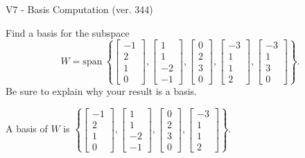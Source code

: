 \begin{exercise}
  \begin{exerciseTitle}V7 - Basis Computation (ver. 344)\end{exerciseTitle}
  \begin{exerciseStatement}
    Find a basis for the subspace 
\[W=\mathrm{span}\ \left\{\left[\begin{array}{r}
-1 \\
2 \\
1 \\
0
\end{array}\right] , \left[\begin{array}{r}
1 \\
1 \\
-2 \\
-1
\end{array}\right] , \left[\begin{array}{r}
0 \\
2 \\
3 \\
0
\end{array}\right] , \left[\begin{array}{r}
-3 \\
1 \\
1 \\
2
\end{array}\right] , \left[\begin{array}{r}
-3 \\
1 \\
3 \\
0
\end{array}\right]\right\}.\]
 Be sure to explain why your result is a basis.


  \end{exerciseStatement}
  \begin{exerciseAnswer}
   A basis of \(W\) is  \(\left\{\left[\begin{array}{r}
-1 \\
2 \\
1 \\
0
\end{array}\right] , \left[\begin{array}{r}
1 \\
1 \\
-2 \\
-1
\end{array}\right] , \left[\begin{array}{r}
0 \\
2 \\
3 \\
0
\end{array}\right] , \left[\begin{array}{r}
-3 \\
1 \\
1 \\
2
\end{array}\right]\right\}\).
  


  \end{exerciseAnswer}
\end{exercise}